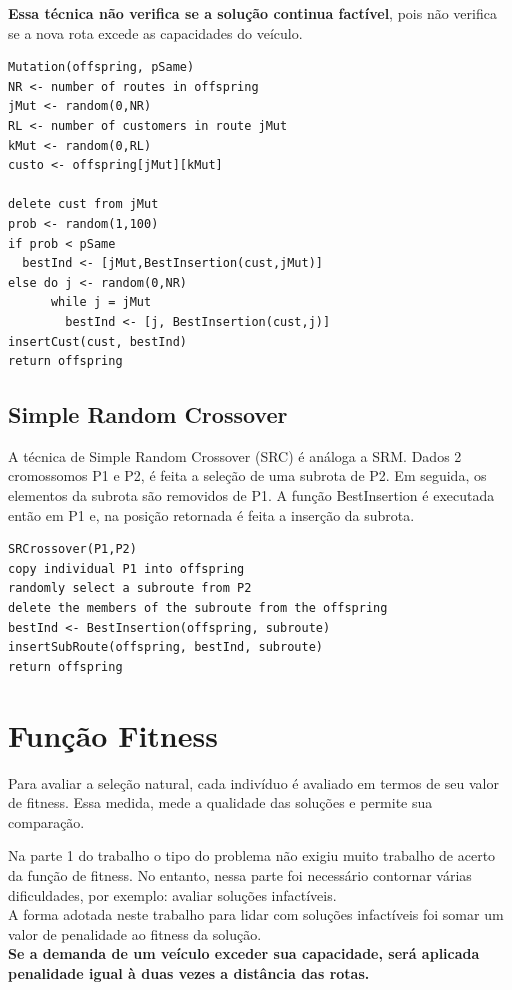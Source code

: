 \documentclass[conference]{IEEEtran}
\begin{document}
\textbf{Essa técnica não verifica se a solução continua factível}, pois não verifica se a nova rota excede as capacidades do veículo.

\begin{verbatim}
Mutation(offspring, pSame)
NR <- number of routes in offspring
jMut <- random(0,NR)
RL <- number of customers in route jMut
kMut <- random(0,RL)
custo <- offspring[jMut][kMut]

delete cust from jMut
prob <- random(1,100)
if prob < pSame
  bestInd <- [jMut,BestInsertion(cust,jMut)]
else do j <- random(0,NR)
      while j = jMut
        bestInd <- [j, BestInsertion(cust,j)]
insertCust(cust, bestInd)
return offspring
\end{verbatim}

\subsection{Simple Random Crossover}
A técnica de Simple Random Crossover (SRC) é análoga a SRM. Dados 2 cromossomos P1 e P2, é feita a seleção de uma subrota de P2. Em seguida, os elementos da subrota são removidos de P1. A função BestInsertion é executada então em P1 e, na posição retornada é feita a inserção da subrota.

\begin{verbatim}
SRCrossover(P1,P2)
copy individual P1 into offspring
randomly select a subroute from P2
delete the members of the subroute from the offspring
bestInd <- BestInsertion(offspring, subroute)
insertSubRoute(offspring, bestInd, subroute)
return offspring
\end{verbatim}

\section{Função Fitness}
Para avaliar a seleção natural, cada indivíduo é avaliado em termos de seu valor de fitness. Essa medida, mede a qualidade das soluções e permite sua comparação.

Na parte 1 do trabalho o tipo do problema não exigiu muito trabalho de acerto da função de fitness. No entanto, nessa parte foi necessário contornar várias dificuldades, por exemplo: avaliar soluções infactíveis.\\
A forma adotada neste trabalho para lidar com soluções infactíveis foi somar um valor de penalidade ao fitness da solução.\\
\textbf{Se a demanda de um veículo exceder sua capacidade, será aplicada penalidade igual à duas vezes a distância das rotas.}
\end{document}
